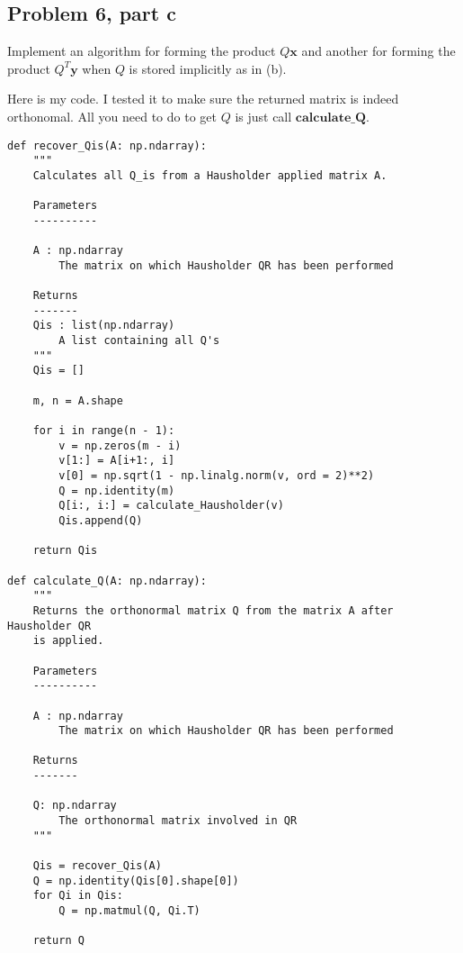 \subsection{Problem 6, part c}
Implement an algorithm for forming the product $Q\textbf{x}$ and another for forming the product $Q^T\textbf{y}$ when $Q$ is stored implicitly as in (b).
\partbreak
\begin{solution}

    Here is my code. I tested it to make sure the returned matrix is indeed orthonomal. All you need to do to get $Q$ is just call $\textbf{calculate\_Q}$.

\begin{lstlisting}
def recover_Qis(A: np.ndarray):
    """
    Calculates all Q_is from a Hausholder applied matrix A.
    
    Parameters
    ----------
    
    A : np.ndarray
        The matrix on which Hausholder QR has been performed
        
    Returns
    -------
    Qis : list(np.ndarray)
        A list containing all Q's 
    """
    Qis = []
    
    m, n = A.shape
    
    for i in range(n - 1):
        v = np.zeros(m - i)
        v[1:] = A[i+1:, i]
        v[0] = np.sqrt(1 - np.linalg.norm(v, ord = 2)**2)
        Q = np.identity(m)
        Q[i:, i:] = calculate_Hausholder(v)
        Qis.append(Q)
    
    return Qis

def calculate_Q(A: np.ndarray):
    """
    Returns the orthonormal matrix Q from the matrix A after Hausholder QR 
    is applied.
    
    Parameters
    ----------
    
    A : np.ndarray
        The matrix on which Hausholder QR has been performed

    Returns
    -------    
    
    Q: np.ndarray
        The orthonormal matrix involved in QR
    """
    
    Qis = recover_Qis(A)
    Q = np.identity(Qis[0].shape[0])
    for Qi in Qis:
        Q = np.matmul(Q, Qi.T)
        
    return Q
\end{lstlisting}
\end{solution}


